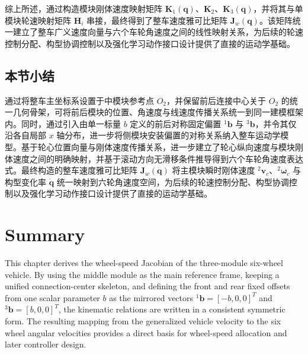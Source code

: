 综上所述，通过构造模块刚体速度映射矩阵 $\mathbf K_1(\mathbf q)$、$\mathbf K_2$、$\mathbf K_3(\mathbf q)$，并将其与单模块轮速映射矩阵 $\mathbf H_i$ 串接，最终得到了整车速度雅可比矩阵 $\mathbf J_w(\mathbf q)$。该矩阵统一建立了整车广义速度向量与六个车轮角速度之间的线性映射关系，为后续的轮速控制分配、构型协调控制以及强化学习动作接口设计提供了直接的运动学基础。

\subsection{本节小结}

通过将整车主坐标系设置于中模块参考点 $O_2$，并保留前后连接中心关于 $O_2$ 的统一几何骨架，可将前后模块的位置、角速度与线速度传播关系统一到同一建模框架内。同时，通过引入由单一标量 $b$ 定义的前后对称固定偏置 ${}^{1}\mathbf b$ 与 ${}^{3}\mathbf b$，并令其仅沿各自局部 $x$ 轴分布，进一步将侧模块安装偏置的对称关系纳入整车运动学模型。基于轮心位置向量与刚体速度传播关系，进一步建立了轮心纵向速度与模块刚体速度之间的明确映射，并基于滚动方向无滑移条件推导得到六个车轮角速度表达式。最终构造的整车速度雅可比矩阵 $\mathbf J_w(\mathbf q)$ 将主模块瞬时刚体速度 ${}^{2}\mathbf v_c$、${}^{2}\boldsymbol\omega_c$ 与构型变化率 $\dot{\mathbf q}$ 统一映射到六轮角速度空间，为后续的轮速控制分配、构型协调控制以及强化学习动作接口设计提供了直接的运动学基础。

\section{Summary}

This chapter derives the wheel-speed Jacobian of the three-module six-wheel vehicle. By using the middle module as the main reference frame, keeping a unified connection-center skeleton, and defining the front and rear fixed offsets from one scalar parameter $b$ as the mirrored vectors ${}^{1}\mathbf b=[-b,0,0]^T$ and ${}^{3}\mathbf b=[b,0,0]^T$, the kinematic relations are written in a consistent symmetric form. The resulting mapping from the generalized vehicle velocity to the six wheel angular velocities provides a direct basis for wheel-speed allocation and later controller design.
